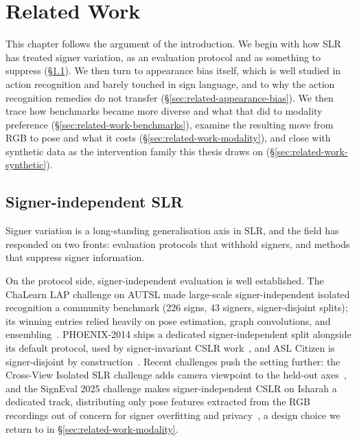 \chapter{Related Work}
This chapter follows the argument of the introduction. We begin with how
SLR has treated signer variation, as an evaluation protocol and as
something to suppress (\S\ref{sec:related-signer-independent}). We then
turn to appearance bias itself, which is well studied in action
recognition and barely touched in sign language, and to why the action
recognition remedies do not transfer
(\S\ref{sec:related-appearance-bias}). We then trace how benchmarks became
more diverse and what that did to modality preference
(\S\ref{sec:related-work-benchmarks}), examine the resulting move from RGB
to pose and what it costs (\S\ref{sec:related-work-modality}), and close
with synthetic data as the intervention family this thesis draws on
(\S\ref{sec:related-work-synthetic}).

\section{Signer-independent SLR}
\label{sec:related-signer-independent}
Signer variation is a long-standing generalisation axis in SLR, and the
field has responded on two fronts: evaluation protocols that withhold
signers, and methods that suppress signer information.

On the protocol side, signer-independent evaluation is well established.
The ChaLearn LAP challenge on AUTSL made large-scale signer-independent
isolated recognition a community benchmark (226 signs, 43 signers,
signer-disjoint splits); its winning entries relied heavily on pose
estimation, graph convolutions, and
ensembling~\cite{sincanChaLearnLAPSigner2021}. PHOENIX-2014 ships a
dedicated signer-independent split alongside its default protocol, used
by signer-invariant CSLR work~\cite{zuoImprovingContinuousSign2024},
and ASL Citizen is signer-disjoint by construction~\cite{aslcitizen}.
Recent challenges push the setting further: the Cross-View Isolated SLR
challenge adds camera viewpoint to the held-out axes~\cite{CV-ISLR},
and the SignEval 2025 challenge makes signer-independent CSLR on Isharah
a dedicated track, distributing only pose features extracted from the
RGB recordings out of concern for signer overfitting and
privacy~\cite{luqmanSignEval2025Challenge2025a,
alyamiIsharahLargeScaleMultiScene2026b}, a design choice we return to in
\S\ref{sec:related-work-modality}.

